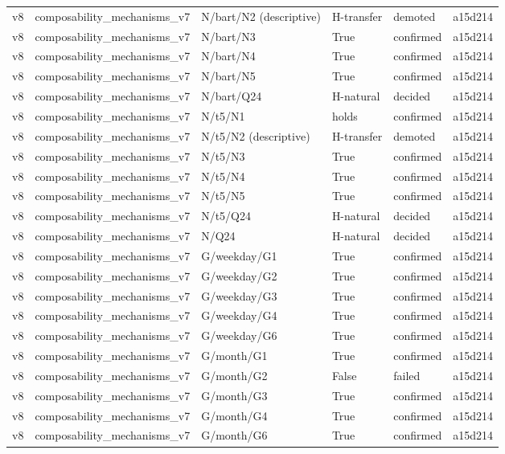 \begin{longtable}{llllll}
v8 & composability\_mechanisms\_v7 & N/bart/N2 (descriptive) & H-transfer & demoted & a15d214 \\
v8 & composability\_mechanisms\_v7 & N/bart/N3 & True & confirmed & a15d214 \\
v8 & composability\_mechanisms\_v7 & N/bart/N4 & True & confirmed & a15d214 \\
v8 & composability\_mechanisms\_v7 & N/bart/N5 & True & confirmed & a15d214 \\
v8 & composability\_mechanisms\_v7 & N/bart/Q24 & H-natural & decided & a15d214 \\
v8 & composability\_mechanisms\_v7 & N/t5/N1 & holds & confirmed & a15d214 \\
v8 & composability\_mechanisms\_v7 & N/t5/N2 (descriptive) & H-transfer & demoted & a15d214 \\
v8 & composability\_mechanisms\_v7 & N/t5/N3 & True & confirmed & a15d214 \\
v8 & composability\_mechanisms\_v7 & N/t5/N4 & True & confirmed & a15d214 \\
v8 & composability\_mechanisms\_v7 & N/t5/N5 & True & confirmed & a15d214 \\
v8 & composability\_mechanisms\_v7 & N/t5/Q24 & H-natural & decided & a15d214 \\
v8 & composability\_mechanisms\_v7 & N/Q24 & H-natural & decided & a15d214 \\
v8 & composability\_mechanisms\_v7 & G/weekday/G1 & True & confirmed & a15d214 \\
v8 & composability\_mechanisms\_v7 & G/weekday/G2 & True & confirmed & a15d214 \\
v8 & composability\_mechanisms\_v7 & G/weekday/G3 & True & confirmed & a15d214 \\
v8 & composability\_mechanisms\_v7 & G/weekday/G4 & True & confirmed & a15d214 \\
v8 & composability\_mechanisms\_v7 & G/weekday/G6 & True & confirmed & a15d214 \\
v8 & composability\_mechanisms\_v7 & G/month/G1 & True & confirmed & a15d214 \\
v8 & composability\_mechanisms\_v7 & G/month/G2 & False & failed & a15d214 \\
v8 & composability\_mechanisms\_v7 & G/month/G3 & True & confirmed & a15d214 \\
v8 & composability\_mechanisms\_v7 & G/month/G4 & True & confirmed & a15d214 \\
v8 & composability\_mechanisms\_v7 & G/month/G6 & True & confirmed & a15d214 \\

\end{longtable}
